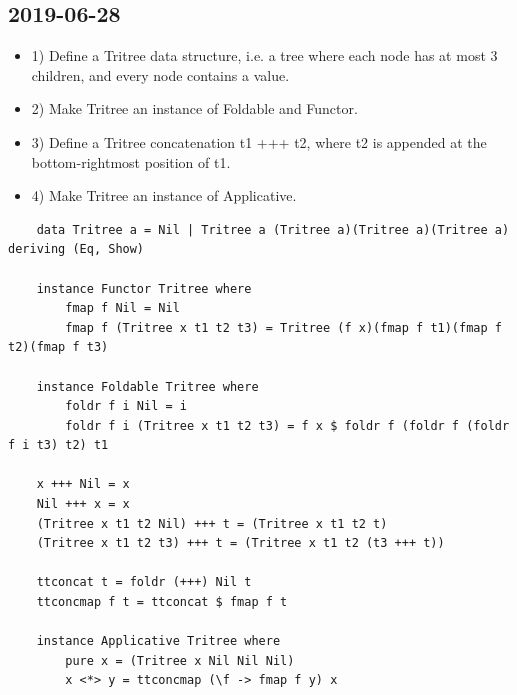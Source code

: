\subsection{2019-06-28}
\begin{itemize}
    \item 1) Define a Tritree data structure, i.e. a tree where each node has at most 3 children, and every node contains a value.
    \item 2) Make Tritree an instance of Foldable and Functor.
    \item 3) Define a Tritree concatenation t1 +++ t2, where t2 is appended at the bottom-rightmost position of t1.
    \item 4) Make Tritree an instance of Applicative.
\end{itemize}
\begin{lstlisting}
    data Tritree a = Nil | Tritree a (Tritree a)(Tritree a)(Tritree a) deriving (Eq, Show)

    instance Functor Tritree where
        fmap f Nil = Nil
        fmap f (Tritree x t1 t2 t3) = Tritree (f x)(fmap f t1)(fmap f t2)(fmap f t3)

    instance Foldable Tritree where
        foldr f i Nil = i
        foldr f i (Tritree x t1 t2 t3) = f x $ foldr f (foldr f (foldr f i t3) t2) t1

    x +++ Nil = x
    Nil +++ x = x
    (Tritree x t1 t2 Nil) +++ t = (Tritree x t1 t2 t)
    (Tritree x t1 t2 t3) +++ t = (Tritree x t1 t2 (t3 +++ t))

    ttconcat t = foldr (+++) Nil t
    ttconcmap f t = ttconcat $ fmap f t

    instance Applicative Tritree where
        pure x = (Tritree x Nil Nil Nil)
        x <*> y = ttconcmap (\f -> fmap f y) x
\end{lstlisting}

